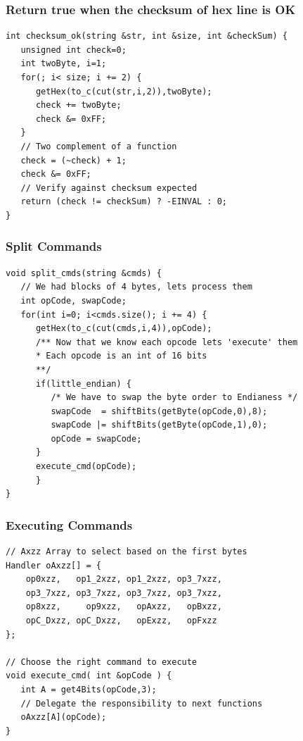 \documentclass{beamer}
\begin{document}
\begin{frame}[fragile]
\frametitle{ Return true when the checksum of hex line is OK }
\begin{example}[ C++ Implementation ]
\begin{lstlisting}
int checksum_ok(string &str, int &size, int &checkSum) {
   unsigned int check=0;
   int twoByte, i=1;
   for(; i< size; i += 2) {
      getHex(to_c(cut(str,i,2)),twoByte);
      check += twoByte;
      check &= 0xFF;
   }
   // Two complement of a function
   check = (~check) + 1;
   check &= 0xFF;
   // Verify against checksum expected
   return (check != checkSum) ? -EINVAL : 0;
}
\end{lstlisting}
\end{example}
\end{frame}
\begin{frame}[fragile]
\frametitle{ Split Commands  }
\begin{example}
\begin{lstlisting}
void split_cmds(string &cmds) {
   // We had blocks of 4 bytes, lets process them
   int opCode, swapCode;
   for(int i=0; i<cmds.size(); i += 4) {
      getHex(to_c(cut(cmds,i,4)),opCode);
      /** Now that we know each opcode lets 'execute' them
      * Each opcode is an int of 16 bits
      **/
      if(little_endian) {
         /* We have to swap the byte order to Endianess */
         swapCode  = shiftBits(getByte(opCode,0),8);
         swapCode |= shiftBits(getByte(opCode,1),0);
         opCode = swapCode;
      }
      execute_cmd(opCode);
      }
}
\end{lstlisting}
\end{example}
\end{frame}
\begin{frame}[fragile]
\frametitle{ Executing Commands }
\begin{example}
\begin{lstlisting}
// Axzz Array to select based on the first bytes
Handler oAxzz[] = {
    op0xzz,   op1_2xzz, op1_2xzz, op3_7xzz,
    op3_7xzz, op3_7xzz, op3_7xzz, op3_7xzz,
    op8xzz,     op9xzz,   opAxzz,   opBxzz,
    opC_Dxzz, opC_Dxzz,   opExzz,   opFxzz
};

// Choose the right command to execute  
void execute_cmd( int &opCode ) {
   int A = get4Bits(opCode,3);
   // Delegate the responsibility to next functions
   oAxzz[A](opCode);
}
\end{lstlisting}
\end{example}
\end{frame}
\end{document}
